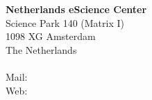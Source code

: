 

\setlength{\parindent}{0pt}
\setlength{\parskip}{1em}


\vspace{10cm} 
\textbf{Netherlands eScience Center} \\
Science Park 140 (Matrix I)\\
1098 XG Amsterdam\\
The Netherlands \\
 \\
Mail:  \\
Web:  \\
